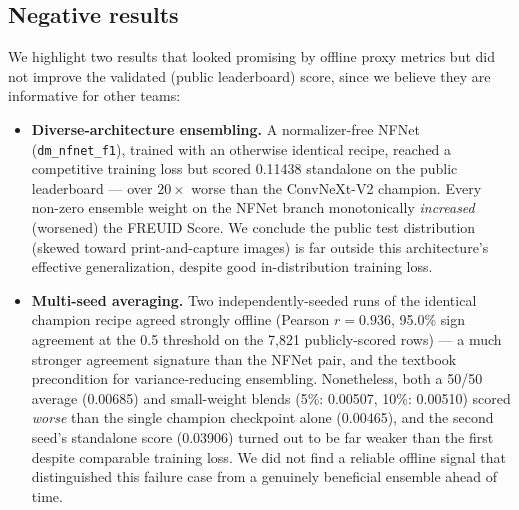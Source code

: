 \documentclass[11pt,a4paper]{article}
\begin{document}
\subsection{Negative results}
We highlight two results that looked promising by offline proxy metrics but
did not improve the validated (public leaderboard) score, since we believe
they are informative for other teams:
\begin{itemize}[noitemsep]
  \item \textbf{Diverse-architecture ensembling.} A normalizer-free NFNet
  (\texttt{dm\_nfnet\_f1}), trained with an otherwise identical recipe,
  reached a competitive training loss but scored 0.11438 standalone on the
  public leaderboard — over $20\times$ worse than the ConvNeXt-V2 champion.
  Every non-zero ensemble weight on the NFNet branch monotonically
  \emph{increased} (worsened) the FREUID Score. We conclude the public test
  distribution (skewed toward print-and-capture images) is far outside this
  architecture's effective generalization, despite good in-distribution
  training loss.
  \item \textbf{Multi-seed averaging.} Two independently-seeded runs of the
  identical champion recipe agreed strongly offline (Pearson $r = 0.936$,
  95.0\% sign agreement at the 0.5 threshold on the 7{,}821 publicly-scored
  rows) — a much stronger agreement signature than the NFNet pair, and the
  textbook precondition for variance-reducing ensembling. Nonetheless, both
  a 50/50 average (0.00685) and small-weight blends (5\%: 0.00507, 10\%:
  0.00510) scored \emph{worse} than the single champion checkpoint alone
  (0.00465), and the second seed's standalone score (0.03906) turned out to
  be far weaker than the first despite comparable training loss. We did not
  find a reliable offline signal that distinguished this failure case from a
  genuinely beneficial ensemble ahead of time.
\end{itemize}
\end{document}
